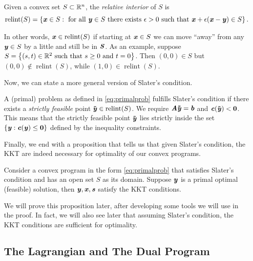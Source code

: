 {\begin{definition} \label{def:relint}
  Given a convex set $S \subset \mathbb{R}^n$, the \emph{relative interior} of $S$ is
  \[
    \operatorname{relint}(S) = \left\{\boldsymbol{\mathit{x}} \in S : \text{ for all } \boldsymbol{\mathit{y}}
      \in S \text{ there exists } \epsilon > 0 \text{ such that }
      \boldsymbol{\mathit{x}} + \epsilon(\boldsymbol{\mathit{x}} - \boldsymbol{\mathit{y}}) \in S \right\}
    .
  \]
\end{definition}
In other words, $\boldsymbol{\mathit{x}} \in \operatorname{relint}(S)$ if starting at $\boldsymbol{\mathit{x}}
\in S$ we can move
``away'' from any $\boldsymbol{\mathit{y}} \in S$ by a little and still be in $\boldsymbol{\mathit{S}}$.
As an example, suppose $S = \left\{(s,t) \in \mathbb{R}^2 \text{ such that } s
  \geq 0 \text{ and } t = 0 \right\}$.
Then $(0,0) \in S$ but $(0,0) \not\in \operatorname{relint}(S)$, while
$(1,0) \in \operatorname{relint}(S)$.

Now, we can state a more general version of Slater's condition.

\begin{definition} \label{def:slatergeneral}
A (primal) problem as defined in \eqref{eq:primalprob} fulfills
Slater's condition if there exists a \emph{strictly feasible} point
$\boldsymbol{\tilde{\mathit{y}}} \in \operatorname{relint}(S)$.
We require $\boldsymbol{\mathit{A}}\boldsymbol{\tilde{\mathit{y}}} = \boldsymbol{\mathit{b}}$ and $\boldsymbol{\mathit{c}}(\boldsymbol{\tilde{\mathit{y}}}) <
\boldsymbol{0}$.
This means that the strictly feasible point $\boldsymbol{\tilde{\mathit{y}}}$ lies strictly inside the set $\{\boldsymbol{\mathit{y}} : \boldsymbol{\mathit{c}}(\boldsymbol{\mathit{y}}) \leq \boldsymbol{0}\}$ defined by the inequality constraints.
\end{definition}

Finally, we end with a proposition that tells us that given Slater's
condition, the KKT are indeed necessary for optimality of our convex programs.

\begin{proposition}
  \label{pro:KKTnecessary}
  Consider a convex program in the form \eqref{eq:primalprob} that
  satisfies Slater's condition and has an open set $S$ as its domain.
  Suppose $\boldsymbol{\mathit{y}}$ is a primal optimal (feasible) solution,
  then  $\boldsymbol{\mathit{y}}, \boldsymbol{\mathit{x}}, \boldsymbol{\mathit{s}}$ satisfy the KKT conditions.
\end{proposition}

We will prove this proposition later, after developing some tools we will
use in the proof.
In fact, we will also see later that assuming Slater's condition, the KKT
conditions are sufficient for optimality.

\subsection{The Lagrangian and The Dual Program}

}
